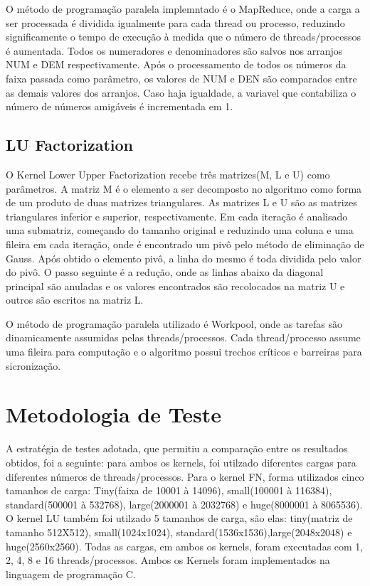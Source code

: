 \documentclass[12pt]{article}
\begin{document}
O método de programação paralela implemntado é o MapReduce, onde a carga a ser processada é dividida igualmente para cada thread ou processo, reduzindo significamente o tempo de execução à medida que o número de threads/processos é aumentada. Todos os numeradores e denominadores são salvos nos arranjos NUM e DEM respectivamente. Após o processamento de todos os números da faixa passada como parâmetro,
os valores de NUM e DEN são comparados entre as demais valores dos arranjos. Caso haja igualdade, a variavel que contabiliza o número de números amigáveis é incrementada em 1.

\subsection{LU Factorization}

O Kernel Lower Upper Factorization recebe três matrizes(M, L e U) como parâmetros. A matriz M é o elemento a ser decomposto no algoritmo como forma de um produto de duas matrizes triangulares. As matrizes L e U são as matrizes triangulares inferior e superior, respectivamente. Em cada iteração é analisado uma submatriz, começando do tamanho original e reduzindo uma coluna e uma fileira em cada iteração, onde é encontrado um pivô pelo método de eliminação de Gauss. Após obtido o elemento pivô, a linha do mesmo é toda dividida pelo valor do pivô. O passo seguinte é a redução, onde as linhas abaixo da diagonal principal são anuladas e os valores encontrados são recolocados na matriz U e outros são escritos na matriz L.

O método de programação paralela utilizado é Workpool, onde as tarefas são dinamicamente assumidas pelas threads/processos. Cada thread/processo assume uma fileira para computação e o algoritmo possui trechos críticos e barreiras para sicronização. 


\section{Metodologia de Teste}
A estratégia de testes adotada, que permitiu a comparação entre os resultados obtidos, foi a seguinte: para ambos os kernels, foi utilzado diferentes cargas para diferentes números de threads/processos. Para o kernel FN, forma utilizados cinco tamanhos de carga: Tiny(faixa de 10001 à 14096), small(100001 à 116384), standard(500001 à 532768), large(2000001 à 2032768) e huge(8000001 à 8065536). O kernel LU também foi utilzado 5 tamanhos de carga, são elas: tiny(matriz de tamanho 512X512), small(1024x1024), standard(1536x1536),large(2048x2048) e huge(2560x2560). Todas as cargas, em ambos os kernels, foram executadas com 1, 2, 4, 8 e 16 threads/processos. Ambos os Kernels foram implementados na linguagem de programação C.
\end{document}
